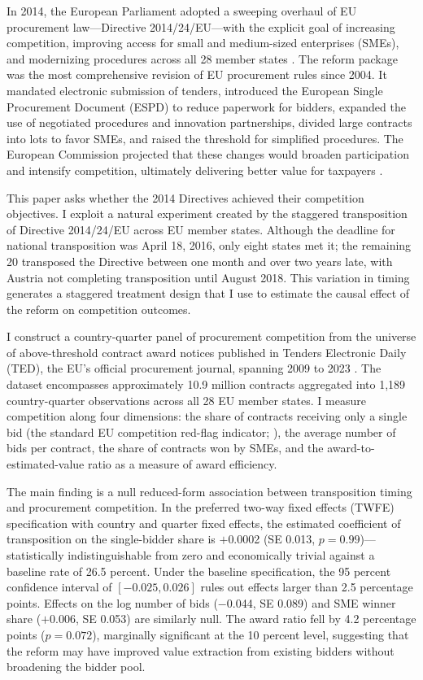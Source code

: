 \documentclass[12pt]{article}
\begin{document}
In 2014, the European Parliament adopted a sweeping overhaul of EU procurement law---Directive 2014/24/EU---with the explicit goal of increasing competition, improving access for small and medium-sized enterprises (SMEs), and modernizing procedures across all 28 member states \citep{directive201424}. The reform package was the most comprehensive revision of EU procurement rules since 2004. It mandated electronic submission of tenders, introduced the European Single Procurement Document (ESPD) to reduce paperwork for bidders, expanded the use of negotiated procedures and innovation partnerships, divided large contracts into lots to favor SMEs, and raised the threshold for simplified procedures. The European Commission projected that these changes would broaden participation and intensify competition, ultimately delivering better value for taxpayers \citep{europeancommission2017}.

This paper asks whether the 2014 Directives achieved their competition objectives. I exploit a natural experiment created by the staggered transposition of Directive 2014/24/EU across EU member states. Although the deadline for national transposition was April 18, 2016, only eight states met it; the remaining 20 transposed the Directive between one month and over two years late, with Austria not completing transposition until August 2018. This variation in timing generates a staggered treatment design that I use to estimate the causal effect of the reform on competition outcomes.

I construct a country-quarter panel of procurement competition from the universe of above-threshold contract award notices published in Tenders Electronic Daily (TED), the EU's official procurement journal, spanning 2009 to 2023 \citep{ted2023}. The dataset encompasses approximately 10.9 million contracts aggregated into 1,189 country-quarter observations across all 28 EU member states. I measure competition along four dimensions: the share of contracts receiving only a single bid (the standard EU competition red-flag indicator; \citealt{fazekasKocsis2020}), the average number of bids per contract, the share of contracts won by SMEs, and the award-to-estimated-value ratio as a measure of award efficiency.

The main finding is a null reduced-form association between transposition timing and procurement competition. In the preferred two-way fixed effects (TWFE) specification with country and quarter fixed effects, the estimated coefficient of transposition on the single-bidder share is $+$0.0002 (SE 0.013, $p = 0.99$)---statistically indistinguishable from zero and economically trivial against a baseline rate of 26.5 percent. Under the baseline specification, the 95 percent confidence interval of $[-0.025, 0.026]$ rules out effects larger than 2.5 percentage points. Effects on the log number of bids ($-$0.044, SE 0.089) and SME winner share ($+$0.006, SE 0.053) are similarly null. The award ratio fell by 4.2 percentage points ($p = 0.072$), marginally significant at the 10 percent level, suggesting that the reform may have improved value extraction from existing bidders without broadening the bidder pool.
\end{document}
